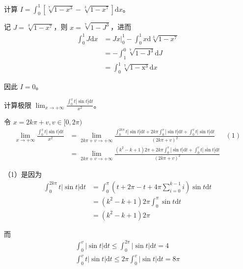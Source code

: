 \begin{ques}
	计算 $\displaystyle I=\int _{0}^{1}\left[\sqrt[7]{1-x^{3}} -\sqrt[3]{1-x^{7}}\right]\mathrm{d} x$。
\end{ques}

记 $\displaystyle J=\sqrt[3]{1-x^{7}}$，则 $\displaystyle x=\sqrt[7]{1-J^{3}}$，进而
\begin{align*}
	\int _{0}^{1} J\mathrm{d} x & = Jx | _{0}^{1} -\int _{0}^{1} x\mathrm{d}\sqrt[3]{1-x^{7}}\\
	& =-\int _{1}^{0}\mathrm{\sqrt[7]{1-J^{3}} d} J\ \\
	& =\int _{0}^{1}\mathrm{\sqrt[7]{1-x^{3}} d} x
\end{align*}


因此 $\displaystyle I=0$。







\begin{ques}
	计算极限 $\displaystyle \lim _{x\rightarrow +\infty }\frac{\int _{0}^{x} t|\sin t|\mathrm{d} t}{x^{2}}$。
\end{ques}



令 $\displaystyle x=2k\pi +v,v\in [ 0,2\pi )$
\begin{align*}
	\lim _{x\rightarrow +\infty }\frac{\int _{0}^{x} t|\sin t|\mathrm{d} t}{x^{2}} & =\lim _{2k\pi +v\rightarrow +\infty }\frac{\int _{0}^{2k\pi } t|\sin t|\mathrm{d} t+2k\pi \int _{0}^{v} |\sin t|\mathrm{d} t+\int _{0}^{v} t|\sin t|\mathrm{d} t}{( 2k\pi +v)^{2}} & (1)\\
	& =\lim _{2k\pi +v\rightarrow +\infty }\frac{\left( k^{2} -k+1\right) 2\pi +2k\pi \int _{0}^{v} |\sin t|\mathrm{d} t+\int _{0}^{v} t|\sin t|\mathrm{d} t}{( 2k\pi +v)^{2}}
\end{align*}

（1）是因为
\begin{align*}
	\int _{0}^{2k\pi } t|\sin t|\mathrm{d} t & =\int _{0}^{\pi }\left( t+2\pi -t+4\pi \sum _{i=0}^{k-1} i\right)\sin t\mathrm{d} t\\
	& =\left( k^{2} -k+1\right) 2\pi \int _{0}^{\pi }\sin t\mathrm{d} t\\
	& =\left( k^{2} -k+1\right) 2\pi 
\end{align*}

而 
\begin{gather*}
	\int _{0}^{v} |\sin t|\mathrm{d} t\leqslant \int _{0}^{2\pi } |\sin t|\mathrm{d} t=4\\
	\int _{0}^{v} t|\sin t|\mathrm{d} t\leqslant 2\pi \int _{0}^{v} |\sin t|\mathrm{d} t=8\pi 
\end{gather*}


